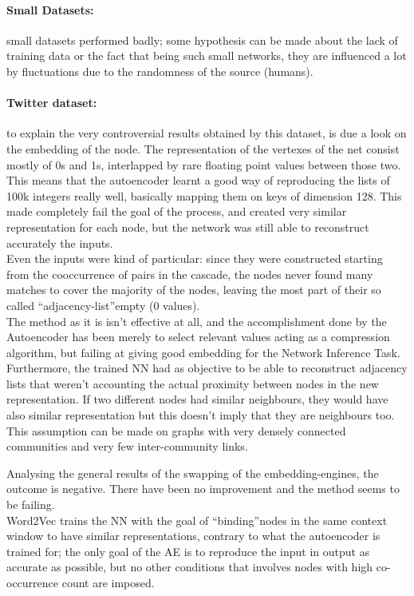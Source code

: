 \documentclass{article}
\begin{document}
			
				\paragraph{Small Datasets:} small datasets performed badly; some hypothesis can be made about the lack of training data or the fact that being such small networks, they are influenced a lot by fluctuations due to the randomness of the source (humans).
				\paragraph{Twitter dataset:} to explain the very controversial results obtained by this dataset, is due a look on the embedding of the node. The representation of the vertexes of the net consist mostly of 0s and 1s, interlapped by rare floating point values between those two. This means that the autoencoder learnt a good way of reproducing the lists of 100k integers really well, basically mapping them on keys of dimension 128. This made completely fail the goal of the process, and created very similar representation for each node, but the network was still able to reconstruct accurately the inputs.\\
				Even the inputs were kind of particular: since they were constructed starting from the cooccurrence of pairs in the cascade, the nodes never found many matches to cover the majority of the nodes, leaving the most part of their so called \textquotedblleft adjacency-list\textquotedblright empty (0 values). \bigskip \\
				The method as it is isn't effective at all, and the accomplishment done by the Autoencoder has been merely to select relevant values acting as a compression algorithm, but failing at giving good embedding for the Network Inference Task. Furthermore, the trained NN had as objective to be able to reconstruct adjacency lists that weren't accounting the actual proximity between nodes in the new representation. If two different nodes had similar neighbours, they would have also similar representation but this doesn't imply that they are neighbours too. This assumption can be made on graphs with very densely connected communities and very few inter-community links.
				
				Analysing the general results of the swapping of the embedding-engines, the outcome is negative. There have been no improvement and the method seems to be failing.\\
				Word2Vec trains the NN with the goal of \textquotedblleft binding\textquotedblright nodes in the same context window to have similar representations, contrary to what the autoencoder is trained for; the only goal of the AE is to reproduce the input in output as accurate as possible, but no other conditions that involves nodes with high co-occurrence count are imposed.
				\newpage
\end{document}
